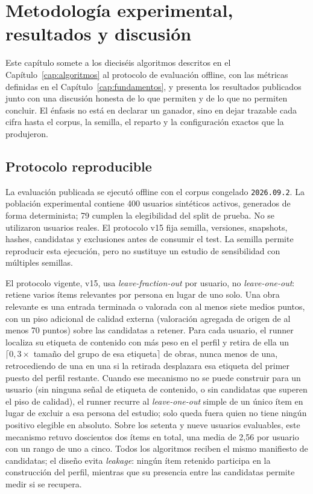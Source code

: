 \chapter{Metodología experimental, resultados y discusión}\label{cap:experimentos}

Este capítulo somete a los dieciséis algoritmos descritos en el Capítulo~\ref{cap:algoritmos} al
protocolo de evaluación offline, con las métricas definidas en el Capítulo~\ref{cap:fundamentos},
y presenta los resultados publicados junto con una discusión honesta de lo que permiten y de lo
que no permiten concluir. El énfasis no está en declarar un ganador, sino en dejar trazable cada
cifra hasta el corpus, la semilla, el reparto y la configuración exactos que la produjeron.

\section{Protocolo reproducible}

La evaluación publicada se ejecutó offline con el corpus congelado \texttt{2026.09.2}. La población experimental contiene 400 usuarios sintéticos activos, generados de forma determinista; 79 cumplen la elegibilidad del split de prueba. No se utilizaron usuarios reales. El protocolo v15 fija semilla, versiones, snapshots, hashes, candidatas y exclusiones antes de consumir el test. La semilla permite reproducir esta ejecución, pero no sustituye un estudio de sensibilidad con múltiples semillas.

El protocolo vigente, v15, usa \emph{leave-fraction-out} por usuario, no
\emph{leave-one-out}: retiene varios ítems relevantes por persona en lugar de uno solo. Una
obra relevante es una entrada terminada o valorada con al menos siete medios puntos, con un
piso adicional de calidad externa (valoración agregada de origen de al menos 70 puntos) sobre
las candidatas a retener. Para cada usuario, el runner localiza su etiqueta de contenido con
más peso en el perfil y retira de ella un \(\lceil 0{,}3\times\) tamaño del grupo de esa
etiqueta\(\rceil\) de obras, nunca menos de una, retrocediendo de una en una si la retirada
desplazara esa etiqueta del primer puesto del perfil restante. Cuando ese mecanismo no se
puede construir para un usuario (sin ninguna señal de etiqueta de contenido, o sin candidatas
que superen el piso de calidad), el runner recurre al \emph{leave-one-out} simple de un único
ítem en lugar de excluir a esa persona del estudio; solo queda fuera quien no tiene ningún
positivo elegible en absoluto. Sobre los setenta y nueve usuarios evaluables, este mecanismo
retuvo doscientos dos ítems en total, una media de 2{,}56 por usuario con un rango de uno a
cinco. Todos los algoritmos reciben el mismo manifiesto de candidatas; el diseño evita
\emph{leakage}: ningún ítem retenido participa en la construcción del perfil, mientras que su
presencia entre las candidatas permite medir si se recupera.

